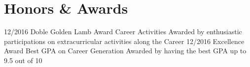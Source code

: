 \documentclass[]{friggeri-cv}
\begin{document}
\section{Honors \& Awards}
\begin{entrylist}
  \entry
    {12/2016}
    {Doble Golden Lamb Award}
    {Career Activities}
    {Awarded by enthusiastic participations on extracurricular activities along the Career }
  \entry
    {12/2016}
    {Excellence Award }
    {Best GPA on Career Generation}
    {Awarded by having the best GPA up to 9.5 out of 10}
\end{entrylist}
\end{document}
